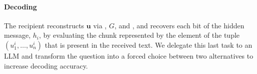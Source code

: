 \paragraph{Decoding}
The recipient reconstructs $\mathbf{u}$ via \key, $G$, and \inp, and recovers each bit of the hidden message, $h_i$, by evaluating the chunk represented by the element of the tuple $(u_1^i, \dots, u_n^i)$  that is present in the received text.
We delegate this last task to an LLM and transform the question into a forced choice between two alternatives to increase decoding accuracy.



